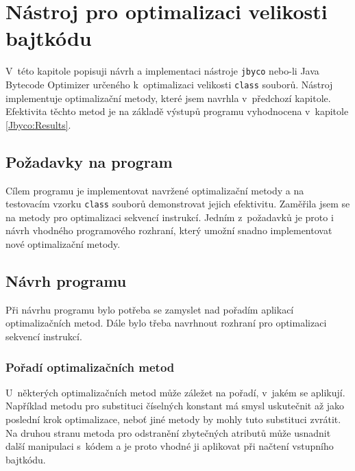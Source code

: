 \chapter{Nástroj pro optimalizaci velikosti bajtkódu}\label{Jbyco}


V~této kapitole popisuji návrh a implementaci nástroje \texttt{jbyco} nebo-li Java Bytecode Optimizer určeného k~optimalizaci velikosti \texttt{class} souborů. Nástroj implementuje optimalizační metody, které jsem navrhla v~předchozí kapitole. Efektivita těchto metod je na základě výstupů programu vyhodnocena v~kapitole \ref{Jbyco:Results}.

\section{Požadavky na program}\label{Jbyco:Requirements}

Cílem programu je implementovat navržené optimalizační metody a na testovacím vzorku \texttt{class} souborů demonstrovat jejich efektivitu. Zaměřila jsem se na metody pro optimalizaci sekvencí instrukcí. Jedním z~požadavků je proto i návrh vhodného programového rozhraní, který umožní snadno implementovat nové optimalizační metody.

\section{Návrh programu}\label{Jbyco:Design}

Při návrhu programu bylo potřeba se zamyslet nad pořadím aplikací optimalizačních metod. Dále bylo třeba navrhnout rozhraní pro optimalizaci sekvencí instrukcí.

\subsection{Pořadí optimalizačních metod}

U~některých optimalizačních metod může záležet na pořadí, v~jakém se aplikují. Například metodu pro substituci číselných konstant má smysl uskutečnit až jako poslední krok optimalizace, neboť jiné metody by mohly tuto substituci zvrátit. Na druhou stranu metoda pro odstranění zbytečných atributů může usnadnit další manipulaci s~kódem a je proto vhodné ji aplikovat při načtení vstupního bajtkódu. 

